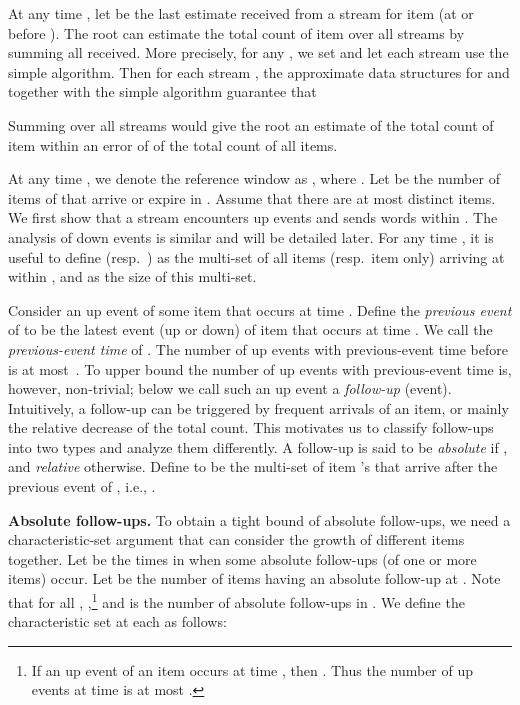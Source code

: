 \documentclass[proceedings]{stacs}
\theoremstyle{definition}\newtheorem{fact}{Fact}
\begin{document}
\vspace{1ex}
At any time ,
let  be the last estimate received from a stream
 for item  (at or before ).  The root can estimate
the total count of item  over all streams by
summing all  received.
More precisely, for any ,
we set  and let each stream
use the simple algorithm.
Then for each stream ,
the approximate data structures for  and
 together with the simple algorithm guarantee that

Summing  over all streams
would give the root an estimate of the total count of item 
within an error of  of the total count of all items.

\vspace{.5ex}
At any time , we denote the reference window as
, where .
 {Let  be the number of items of  that
arrive or expire in .}
Assume that there are at most  distinct items.
We first show that a stream  encounters
 up events
and sends  words
within .  The analysis of down events is similar and will
be detailed later. For any time ,
it is useful to define 
(resp.\ )
as the multi-set of all items (resp.\ item  only)
arriving at  within , and 
as the size of this multi-set.


Consider an up event  of some item 
that occurs at time .
Define the {\em previous event} of  to be
the latest event (up or down) of item 
that occurs at time .
We call  the \emph{previous-event time} of .
The number of up events
with previous-event time before 
is at most~.
To upper bound the number of
up events with previous-event time 
is, however, non-trivial;
below we call such an up event a \emph{follow-up} (event).
Intuitively, a follow-up can be triggered by
frequent arrivals of an item, or mainly
the relative decrease of the total count.
This motivates us to classify follow-ups
into two types and analyze them differently.
A follow-up  is said to be {\em absolute} if
, and {\em relative} otherwise.
Define  to be
the multi-set of item 's that arrive after the
previous event of , i.e., .

\vspace{.5ex}
{\bf Absolute follow-ups.}
To obtain a tight bound of absolute follow-ups, we need
a characteristic-set argument that can
consider the growth of different items together.
Let  be the times in 
when some absolute follow-ups (of one or more items) occur.
Let  be the number of items having an absolute follow-up at .
Note that for all , ,\footnote{
  If an up event of an item  occurs at time ,
  then .
  Thus the number of up events at time  is at most
  .
}  and  is the number of absolute follow-ups in .
We define the characteristic set  at each  as follows:
\end{document}
